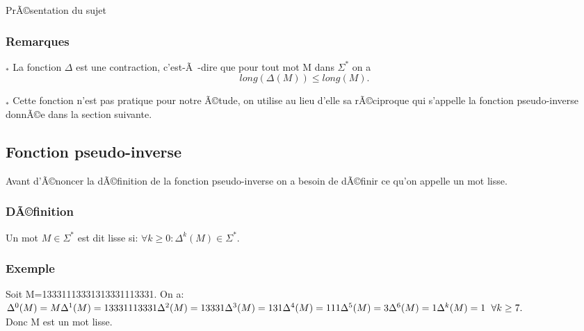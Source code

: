 \documentclass[12pt,a4paper,oneside]{book}
\begin{document}
\begin{titlepage}
\begin{chapter}{PrÃ©sentation du sujet}
\subsubsection*{Remarques}
\par $_*$ La fonction $\Delta$ est une contraction, c'est-Ã -dire que pour tout mot M dans $\Sigma^*$ on a 
$$long(\Delta(M))\leq long(M).$$
\par $_*$ Cette fonction n'est pas pratique pour notre Ã©tude, on utilise au lieu d'elle sa rÃ©ciproque qui s'appelle la fonction pseudo-inverse donnÃ©e dans la section suivante. 
\subsection{Fonction pseudo-inverse}
\par Avant d'Ã©noncer la dÃ©finition de la fonction pseudo-inverse on a besoin de dÃ©finir ce qu'on appelle un mot lisse.
\subsubsection*{DÃ©finition}
\par Un mot $M \in \Sigma^*$ est dit lisse si: $\forall k \geq 0:\Delta^k(M) \in \Sigma^*$.
\subsubsection*{Exemple}
\par Soit M=13331113331313331113331. On a:\\
$ \Delta^0(M)=M\\
\Delta^1(M)=13331113331\\
\Delta^2(M)=13331\\
\Delta^3(M)=131\\
\Delta^4(M)=111\\
\Delta^5(M)=3\\
\Delta^6(M)=1\\
\Delta^k(M)=1\hspace{0,5\baselineskip} \forall k \geq 7.$\\
Donc M est un mot lisse.

\end{chapter}
\end{titlepage}
\end{document}
